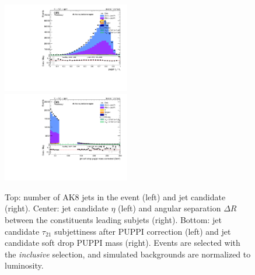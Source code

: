 \begin{figure}[!htb]
\begin{center}
    \includegraphics[width=0.495\textwidth]{plots/v9_U/XVZnnInc/FatJet1_puppiTau21.pdf}
    \includegraphics[width=0.495\textwidth]{plots/v9_U/XVZnnInc/FatJet1_softdropPuppiMassCorr.pdf}

    \caption{Top: number of AK8 jets in the event (left) and \V jet candidate \pt (right). Center: \V jet candidate $\eta$ (left) and angular separation $\Delta R$ between the constituents leading subjets (right). Bottom: \V jet candidate $\tau_{21}$ subjettiness after PUPPI correction (left) and \V jet candidate soft drop PUPPI mass (right). Events are selected with the \emph{inclusive} selection, and simulated backgrounds are normalized to luminosity.}
\label{fig:plot_uno}
  \end{center}
\end{figure}

\clearpage

